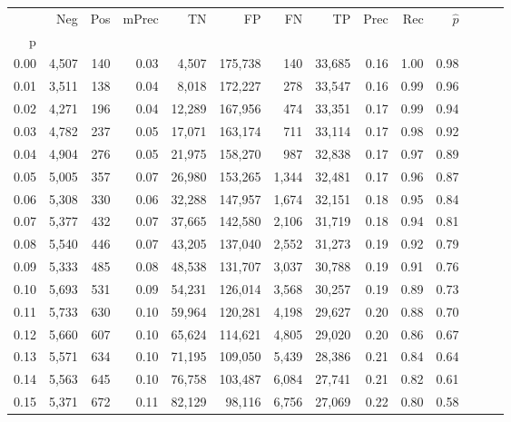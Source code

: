 \begin{tabular}{rrrrrrrrrrrrrr}
\toprule
{} &    Neg &  Pos & mPrec &       TN &       FP &      FN &      TP &  Prec &   Rec & $\hat{p}$ \\
p    &        &      &       &          &          &         &         &       &       &           \\
\midrule
0.00 &  4,507 &  140 &  0.03 &    4,507 &  175,738 &     140 &  33,685 &  0.16 &  1.00 &      0.98 \\
0.01 &  3,511 &  138 &  0.04 &    8,018 &  172,227 &     278 &  33,547 &  0.16 &  0.99 &      0.96 \\
0.02 &  4,271 &  196 &  0.04 &   12,289 &  167,956 &     474 &  33,351 &  0.17 &  0.99 &      0.94 \\
0.03 &  4,782 &  237 &  0.05 &   17,071 &  163,174 &     711 &  33,114 &  0.17 &  0.98 &      0.92 \\
0.04 &  4,904 &  276 &  0.05 &   21,975 &  158,270 &     987 &  32,838 &  0.17 &  0.97 &      0.89 \\
0.05 &  5,005 &  357 &  0.07 &   26,980 &  153,265 &   1,344 &  32,481 &  0.17 &  0.96 &      0.87 \\
0.06 &  5,308 &  330 &  0.06 &   32,288 &  147,957 &   1,674 &  32,151 &  0.18 &  0.95 &      0.84 \\
0.07 &  5,377 &  432 &  0.07 &   37,665 &  142,580 &   2,106 &  31,719 &  0.18 &  0.94 &      0.81 \\
0.08 &  5,540 &  446 &  0.07 &   43,205 &  137,040 &   2,552 &  31,273 &  0.19 &  0.92 &      0.79 \\
0.09 &  5,333 &  485 &  0.08 &   48,538 &  131,707 &   3,037 &  30,788 &  0.19 &  0.91 &      0.76 \\
0.10 &  5,693 &  531 &  0.09 &   54,231 &  126,014 &   3,568 &  30,257 &  0.19 &  0.89 &      0.73 \\
0.11 &  5,733 &  630 &  0.10 &   59,964 &  120,281 &   4,198 &  29,627 &  0.20 &  0.88 &      0.70 \\
0.12 &  5,660 &  607 &  0.10 &   65,624 &  114,621 &   4,805 &  29,020 &  0.20 &  0.86 &      0.67 \\
0.13 &  5,571 &  634 &  0.10 &   71,195 &  109,050 &   5,439 &  28,386 &  0.21 &  0.84 &      0.64 \\
0.14 &  5,563 &  645 &  0.10 &   76,758 &  103,487 &   6,084 &  27,741 &  0.21 &  0.82 &      0.61 \\
0.15 &  5,371 &  672 &  0.11 &   82,129 &   98,116 &   6,756 &  27,069 &  0.22 &  0.80 &      0.58 \\

\end{tabular}
